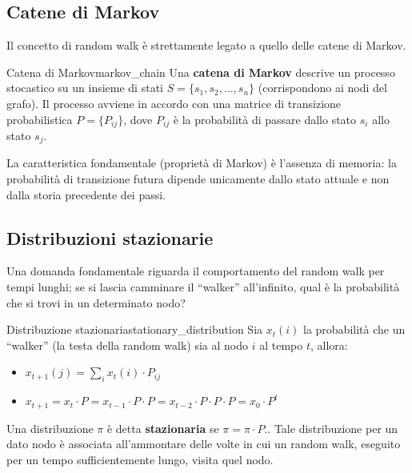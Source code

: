 \subsection{Catene di Markov}

Il concetto di random walk è strettamente legato a quello delle catene di Markov.

\begin{definizione}{Catena di Markov}{markov_chain}
    Una \textbf{catena di Markov} descrive un processo stocastico su un
    insieme di stati $S = \{s_1, s_2, \ldots, s_n\}$ (corrispondono ai nodi
    del grafo).
    Il processo avviene in accordo con una matrice di transizione
    probabilistica $P = \{P_{ij}\}$, dove $P_{ij}$ è la probabilità di passare
    dallo stato $s_i$ allo stato $s_j$.
    
    La caratteristica fondamentale (proprietà di Markov) è l'assenza di
    memoria: la probabilità di transizione futura dipende unicamente dallo
    stato attuale e non dalla storia precedente dei passi.
\end{definizione}

\subsection{Distribuzioni stazionarie}

Una domanda fondamentale riguarda il comportamento del random walk per tempi
lunghi; se si lascia camminare il ``walker'' all'infinito, qual è la
probabilità che si trovi in un determinato nodo?

\begin{definizione}{Distribuzione stazionaria}{stationary_distribution}
    Sia $x_t(i)$ la probabilità che un ``walker'' (la testa della random walk)
    sia al nodo $i$ al tempo $t$, allora:
    \begin{itemize}
        \item $x_{t+1}(j) = \sum_i x_t(i) \cdot P_{ij}$
        \item $x_{t+1} = x_t \cdot P = x_{t-1} \cdot P \cdot P = x_{t-2} \cdot P \cdot P \cdot P = x_0 \cdot P^t$
    \end{itemize}
    
    Una distribuzione $\pi$ è detta \textbf{stazionaria} se $\pi = \pi \cdot P$..
    Tale distribuzione per un dato nodo è associata all'ammontare delle volte
    in cui un random walk, eseguito per un tempo sufficientemente lungo,
    visita quel nodo.
\end{definizione}

